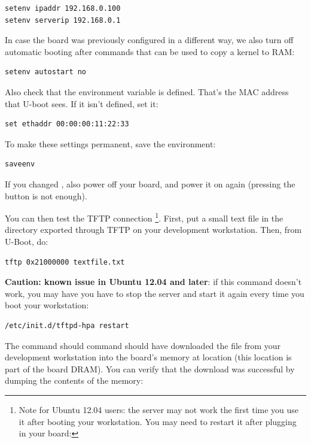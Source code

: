 \begin{verbatim}
setenv ipaddr 192.168.0.100
setenv serverip 192.168.0.1
\end{verbatim}

In case the board was previously configured in a different way, we
also turn off automatic booting after commands that can be used to
copy a kernel to RAM:

\begin{verbatim}
setenv autostart no
\end{verbatim}

Also check that the  environment variable is
defined. That's the MAC address that U-boot sees. If it isn't defined,
set it:

\begin{verbatim}
set ethaddr 00:00:00:11:22:33
\end{verbatim}

To make these settings permanent, save the environment:

\begin{verbatim}
saveenv
\end{verbatim}

If you changed , also power off your board, and power it
on again (pressing the  button is not enough).

You can then test the TFTP connection
\footnote{Note for Ubuntu 12.04 users: the 
server may not work the first time you use it after booting your 
workstation. You may need to restart it after plugging in your board: 
}.
First, put a small text file in
the directory exported through TFTP on your development
workstation. Then, from U-Boot, do:

\begin{verbatim}
tftp 0x21000000 textfile.txt
\end{verbatim}

{\bf Caution: known issue in Ubuntu 12.04 and later}:
if this command doesn't work, you may have you have to stop the server
and start it again every time you boot your workstation:  

\begin{verbatim}
/etc/init.d/tftpd-hpa restart
\end{verbatim}

The  command should command should have downloaded
the  file from your development
workstation into the board's memory at location  (this
location is part of the board DRAM). You can verify that the download
was successful by dumping the contents of the memory:

